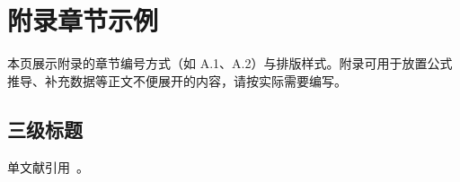 \cleardoublepage
{

    \appendixsecmajornumbering

    \section{附录章节示例}
    \label{sec:appendix_example}

    本页展示附录的章节编号方式（如 A.1、A.2）与排版样式。附录可用于放置公式推导、补充数据等正文不便展开的内容，请按实际需要编写。

    \subsection{三级标题}

    单文献引用~\cite{sutton2018reinforcement}。

    \removeappendixsecmajornumbering
}
